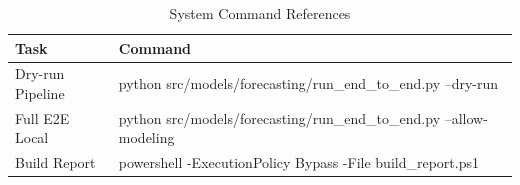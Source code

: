 \begin{table}[htbp]
\centering
\caption{System Command References}
\label{tab:command_reference}
\begin{tabular}{ll}
\toprule
\textbf{Task} & \textbf{Command} \\
\midrule
Dry-run Pipeline & python src/models/forecasting/run\_end\_to\_end.py --dry-run \\
Full E2E Local & python src/models/forecasting/run\_end\_to\_end.py --allow-modeling \\
Build Report & powershell -ExecutionPolicy Bypass -File build\_report.ps1 \\
\bottomrule
\end{tabular}
\end{table}

